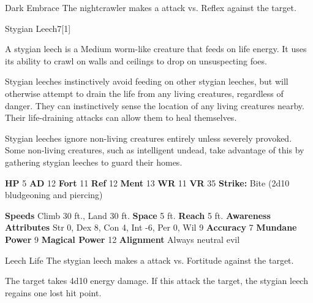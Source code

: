     \begin{freeability}{Dark Embrace}
       The nightcrawler makes a  attack
        vs. Reflex against the target.
    \end{freeability}
  
  \begin{monsection}{Stygian Leech}{7}[1]
    \vspace{-1em}\vspace{-1em}
    \vspace{0em}

    
    
        A stygian leech is a Medium worm-like creature that feeds on life energy.
        It uses its ability to crawl on walls and ceilings to drop on unsuspecting foes.
      
        Stygian leeches instinctively avoid feeding on other stygian leeches, but will otherwise attempt to drain the life from any living creatures, regardless of danger.
        They can instinctively sense the location of any living creatures nearby.
        Their life-draining attacks can allow them to heal themselves.
      
        Stygian leeches ignore non-living creatures entirely unless severely provoked.
        Some non-living creatures, such as intelligent undead, take advantage of this by gathering stygian leeches to guard their homes.
      

    \begin{spellcontent}
      \begin{spelltargetinginfo}
        \pari \textbf{HP} 5 \monsep
          \textbf{AD} 12 \monsep
          \textbf{Fort} 11 \monsep
          \textbf{Ref} 12 \monsep
          \textbf{Ment} 13
        \pari \textbf{WR} 11 \monsep
        \textbf{VR} 35
        \pari \textbf{Strike:}
            Bite  (2d10 bludgeoning and piercing)
      \end{spelltargetinginfo}
    \end{spellcontent}
    \begin{monsterfooter}
      \pari \textbf{Speeds} Climb 30 ft., Land 30 ft. \monsep
        \textbf{Space} 5 ft. \monsep
        \textbf{Reach} 5 ft.
      \pari \textbf{Awareness} 
      \pari \textbf{Attributes}
        Str 0, Dex 8,
        Con 4, Int -6,
        Per 0, Wil 9
      \pari \textbf{Accuracy} 7 \monsep
        \textbf{Mundane Power} 9 \monsep
      \textbf{Magical Power} 12
      \pari \textbf{Alignment} Always neutral evil
    \end{monsterfooter}
  \end{monsection}
  \begin{freeability}{Leech Life}
       The stygian leech makes a  attack
        vs. Fortitude against the target.
    
    \hit 
          The target takes 4d10 energy damage.
          If this attack  the target, the stygian leech regains one lost hit point.
    \end{freeability}
  
